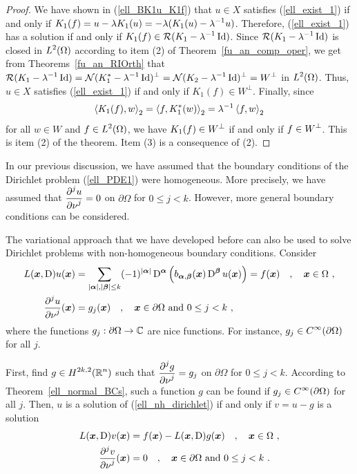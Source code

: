 \begin{proof}
We have shown in (\ref{ell_BK1u_K1f}) that $u\in X$ satisfies
(\ref{ell_exist_1}) if and
only if $\displaystyle K_1(f) = u - \lambda K_1(u)
= -\lambda ( K_1(u) - \lambda^{-1} u)$.
Therefore, (\ref{ell_exist_1}) has a solution if and only if
$\displaystyle K_1(f) \in \mathcal{R}(K_1 - \lambda^{-1}\operatorname{Id})$.  Since
$\displaystyle \mathcal{R}(K_1 -\lambda^{-1}\operatorname{Id})$ is closed in
$\displaystyle L^2(\Omega)$ according to
item (2) of Theorem~\ref{fu_an_comp_oper}, we get
from Theorems~\ref{fu_an_RIOrth} that
$\displaystyle \mathcal{R}(K_1-\lambda^{-1}\operatorname{Id}) = \mathcal{N}(K_1^\ast-\lambda^{-1}\operatorname{Id})^\perp
= \mathcal{N}(K_2-\lambda^{-1}\operatorname{Id})^\perp = W^\perp$ in
$\displaystyle L^2(\Omega)$.  Thus, $u\in X$ satisfies
(\ref{ell_exist_1}) if and only if $K_1(f) \in W^\perp$.  Finally,
since
\[
\left\langle{K_1(f)} , {w}\right\rangle_2 = \left\langle{f} , {K_1^\ast(w)}\right\rangle_2 = \lambda^{-1} \left\langle{f} , {w}\right\rangle_2
\]
for all $w \in W$ and $\displaystyle f \in L^2(\Omega)$,
we have $\displaystyle K_1(f) \in W^\perp$ if and only if
$\displaystyle f\in W^\perp$.  This is
item (2) of the theorem.  Item (3) is a consequence of (2).
\end{proof}

\begin{rmk}
In our previous discussion, we have assumed that the boundary
conditions of the Dirichlet problem (\ref{ell_PDE1}) were homogeneous.
More precisely, we have assumed that
$\displaystyle \frac{\displaystyle \partial^{j}{u}} {\displaystyle \partial \nu^{j}} = 0$ on
$\partial \Omega$ for $0 \leq j < k$.  However, more
general boundary conditions can be considered.   \label{ellRmkNhom}

The variational approach that we have developed before can also be
used to solve Dirichlet problems with non-homogeneous boundary
conditions.  Consider
\begin{equation} \label{ell_nh_dirichlet}
\begin{split}
L({\bm{x}}, \operatorname{D})u({\bm{x}})
&= \sum_{|{\bm{\alpha}}|,|{\bm{\beta}}|\leq k} (-1)^{|{\bm{\alpha}}|}
\operatorname{D}^{{\bm{\alpha}}} \left( b_{{\bm{\alpha}},{\bm{\beta}}}({\bm{x}})
\operatorname{D}^{{\bm{\beta}}} u({\bm{x}})\right) = f({\bm{x}}) \quad
, \quad {\bm{x}} \in \Omega \ ,\\
\frac{\displaystyle \partial^{j}{u}} {\displaystyle \partial \nu^{j}}({\bm{x}}) &= g_j({\bm{x}}) \quad , \quad
{\bm{x}} \in \partial \Omega \ \text{and}\ 0 \leq j < k \ ,
\end{split}
\end{equation}
where the functions $g_j:\partial \Omega \rightarrow \mathbb{C}$ are nice
functions.  For instance,
$\displaystyle g_j \in C^\infty(\partial \Omega)$ for all $j$.

First, find $\displaystyle g\in H^{2k,2}(\mathbb{R}^n)$ such that
$\displaystyle \frac{\displaystyle \partial^{j}{g}} {\displaystyle \partial \nu^{j}} = g_j$ on $\partial \Omega$ for
$0 \leq j < k$.  According to Theorem~\ref{ell_normal_BCs}, such a
function $g$ can be found if
$\displaystyle g_j \in C^\infty(\partial \Omega)$ for
all $j$.  Then, $u$ is a solution of (\ref{ell_nh_dirichlet}) if and
only if $v=u-g$ is a solution
\begin{align*}
L({\bm{x}}, \operatorname{D})v({\bm{x}}) &= f({\bm{x}}) - L({\bm{x}},\operatorname{D}) g({\bm{x}}) \quad
, \quad {\bm{x}} \in \Omega \ ,\\
\frac{\displaystyle \partial^{j}{v}} {\displaystyle \partial \nu^{j}}({\bm{x}}) &= 0 \quad , \quad
{\bm{x}} \in \partial \Omega \ \text{and}\ 0 \leq j < k\ .
\end{align*}
\end{rmk}

